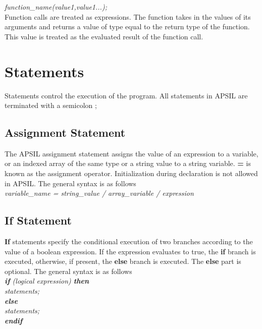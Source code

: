 \documentclass[11pt]{article}
\begin{document}
\textit{function\_name(value1,value1...);}
\\

Function calls are treated as expressions. The function takes in the values of its arguments and returns a value of type equal to the return type of the function. This value is treated as the evaluated result of the function call.




\section{Statements}

Statements control the execution of the program. All statements in APSIL are terminated with a semicolon ;





\subsection{Assignment Statement}
The APSIL assignment statement assigns the value of an expression to a variable, or an indexed array of the same type or a string value to a string variable. \textbf{=} is known as the assignment operator. Initialization during declaration is not allowed in APSIL. The general syntax is as follows \\
\textit{ variable\_name = string\_value / array\_variable / expression }






\subsection{If Statement}
\textbf{If} statements specify the conditional execution of two branches according to the value of a boolean expression. If the expression evaluates to true, the \textbf{if} branch is executed, otherwise, if present, the \textbf{else}  branch is executed. The \textbf{else} part is optional. The general syntax is as follows  \\

\textit{
\textbf{if} (logical expression) \textbf{then}  \\
 \indent \indent statements; \\
\indent \textbf{else} \\
\indent  \indent statements; \\
\indent \textbf{endif}  \\
}
\end{document}
